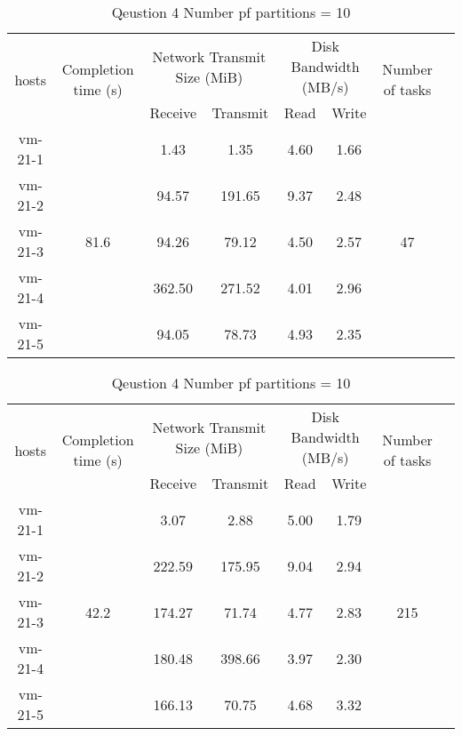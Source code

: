 \begin{enumerate}[label=Question \arabic*.]
         \begin{table}[!h]
        \centering
        \begin{tabular}{|c|c|c|c|c|c|c|c|}
        \hline
            \multirow{2}{*}{hosts} & \multirow{2}{*}{Completion time (s)} & \multicolumn{2}{|c|}{Network Transmit Size (MiB)} & \multicolumn{2}{|c|}{Disk Bandwidth (MB/s)} & \multirow{2}{*}{Number of tasks} \\ 
            \cline{3-6}
        & & Receive & Transmit & Read & Write &  \\
        \hline
            vm-21-1 & \multirow{5}{*}{81.6}  & 1.43   & 1.35   & 4.60 & 1.66 & \multirow{5}{*}{47}  \\
            vm-21-2 &                        & 94.57  & 191.65 & 9.37 & 2.48 &  \\
            vm-21-3 &                        & 94.26  & 79.12  & 4.50 & 2.57 &  \\
            vm-21-4 &                        & 362.50 & 271.52 & 4.01 & 2.96 &  \\
            vm-21-5 &                        & 94.05  & 78.73  & 4.93 & 2.35 &  \\
        \hline
        \end{tabular}
        \caption{Qeustion 4 Number pf partitions = 2}
        \label{tab:q4:RDD2}
        
        \begin{tabular}{|c|c|c|c|c|c|c|c|}
        \hline
            \multirow{2}{*}{hosts} & \multirow{2}{*}{Completion time (s)} & \multicolumn{2}{|c|}{Network Transmit Size (MiB)} & \multicolumn{2}{|c|}{Disk Bandwidth (MB/s)} & \multirow{2}{*}{Number of tasks} \\ 
            \cline{3-6}
        & & Receive & Transmit & Read & Write &  \\
        \hline
            vm-21-1 & \multirow{5}{*}{42.2}  & 3.07   & 2.88   & 5.00 & 1.79 & \multirow{5}{*}{215}  \\
            vm-21-2 &                        & 222.59 & 175.95 & 9.04 & 2.94 &  \\
            vm-21-3 &                        & 174.27 & 71.74  & 4.77 & 2.83 &  \\
            vm-21-4 &                        & 180.48 & 398.66 & 3.97 & 2.30 &  \\
            vm-21-5 &                        & 166.13 & 70.75  & 4.68 & 3.32 &  \\
        \hline
        \end{tabular}
        \caption{Qeustion 4 Number pf partitions = 10}
        \label{tab:q4:RDD10}
        

\end{table}
\end{enumerate}

